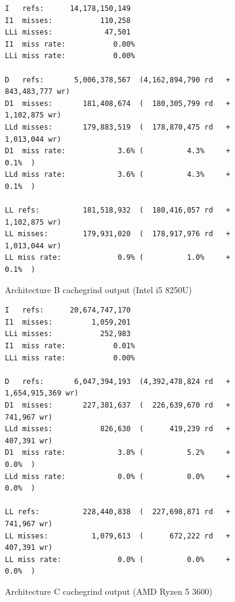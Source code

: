 \documentclass{article}
\begin{document}
\begin{figure}[!h]
\centering
\begin{BVerbatim}
I   refs:      14,178,150,149
I1  misses:           110,258
LLi misses:            47,501
I1  miss rate:           0.00%
LLi miss rate:           0.00%

D   refs:       5,006,378,567  (4,162,894,790 rd   + 843,483,777 wr)
D1  misses:       181,408,674  (  180,305,799 rd   +   1,102,875 wr)
LLd misses:       179,883,519  (  178,870,475 rd   +   1,013,044 wr)
D1  miss rate:            3.6% (          4.3%     +         0.1%  )
LLd miss rate:            3.6% (          4.3%     +         0.1%  )

LL refs:          181,518,932  (  180,416,057 rd   +   1,102,875 wr)
LL misses:        179,931,020  (  178,917,976 rd   +   1,013,044 wr)
LL miss rate:             0.9% (          1.0%     +         0.1%  )
\end{BVerbatim}
\caption{Architecture B cachegrind output (Intel i5 8250U)}
\label{arch_b_cachegrind_laptop}
\end{figure}

\begin{figure}[!h]
\centering
\begin{BVerbatim}
I   refs:      20,674,747,170
I1  misses:         1,059,201
LLi misses:           252,983
I1  miss rate:           0.01%
LLi miss rate:           0.00%

D   refs:       6,047,394,193  (4,392,478,824 rd   + 1,654,915,369 wr)
D1  misses:       227,381,637  (  226,639,670 rd   +       741,967 wr)
LLd misses:           826,630  (      419,239 rd   +       407,391 wr)
D1  miss rate:            3.8% (          5.2%     +           0.0%  )
LLd miss rate:            0.0% (          0.0%     +           0.0%  )

LL refs:          228,440,838  (  227,698,871 rd   +       741,967 wr)
LL misses:          1,079,613  (      672,222 rd   +       407,391 wr)
LL miss rate:             0.0% (          0.0%     +           0.0%  )
\end{BVerbatim}
\caption{Architecture C cachegrind output (AMD Ryzen 5 3600)}
\label{arch_c_cachegrind_pc}
\end{figure}
\end{document}
